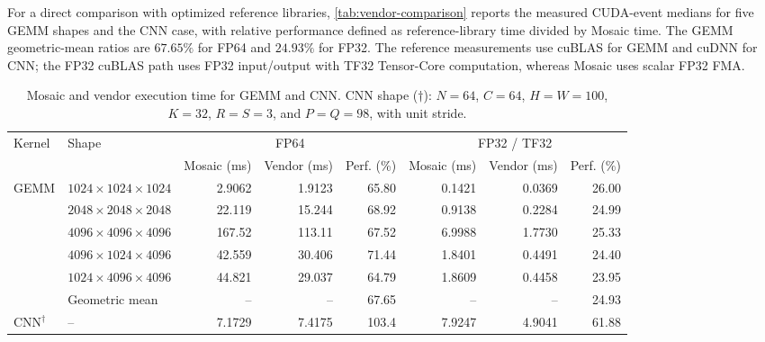 For a direct comparison with optimized reference libraries, \autoref{tab:vendor-comparison} reports the measured CUDA-event medians for five GEMM shapes and the CNN case, with relative performance defined as reference-library time divided by Mosaic time. The GEMM geometric-mean ratios are \(67.65\%\) for FP64 and \(24.93\%\) for FP32. The reference measurements use cuBLAS for GEMM and cuDNN for CNN; the FP32 cuBLAS path uses FP32 input/output with TF32 Tensor-Core computation, whereas Mosaic uses scalar FP32 FMA.

\begin{table}[!t]
\centering
\caption{Mosaic and vendor execution time for GEMM and CNN. CNN shape
(\(\dagger\)): \(N=64\), \(C=64\), \(H=W=100\), \(K=32\), \(R=S=3\), and
\(P=Q=98\), with unit stride.}
\label{tab:vendor-comparison}
\scriptsize
\setlength{\tabcolsep}{2.5pt}
\renewcommand{\arraystretch}{1.04}
\begin{tabular*}{\textwidth}{@{\extracolsep{\fill}}llrrrrrr@{}}
\toprule
\multirow{2}{*}{Kernel} & \multirow{2}{*}{Shape} &
  \multicolumn{3}{c}{FP64} &
  \multicolumn{3}{c}{FP32 / TF32} \\
\cmidrule(lr){3-5}\cmidrule(lr){6-8}
& & Mosaic (ms) & Vendor (ms) & Perf. (\%)
  & Mosaic (ms) & Vendor (ms) & Perf. (\%) \\
\midrule
\multirow{6}{*}{GEMM}
& \(1024\times1024\times1024\) & 2.9062 & 1.9123 & 65.80 & 0.1421 & 0.0369 & 26.00 \\
& \(2048\times2048\times2048\) & 22.119 & 15.244 & 68.92 & 0.9138 & 0.2284 & 24.99 \\
& \(4096\times4096\times4096\) & 167.52 & 113.11 & 67.52 & 6.9988 & 1.7730 & 25.33 \\
& \(4096\times1024\times4096\) & 42.559 & 30.406 & 71.44 & 1.8401 & 0.4491 & 24.40 \\
& \(1024\times4096\times4096\) & 44.821 & 29.037 & 64.79 & 1.8609 & 0.4458 & 23.95 \\
& Geometric mean & -- & -- & 67.65 & -- & -- & 24.93 \\
\midrule
CNN\(^{\dagger}\) & -- & 7.1729 & 7.4175 & 103.4 & 7.9247 & 4.9041 & 61.88 \\
\bottomrule
\end{tabular*}
\vspace{-0.5\baselineskip}
\end{table}

